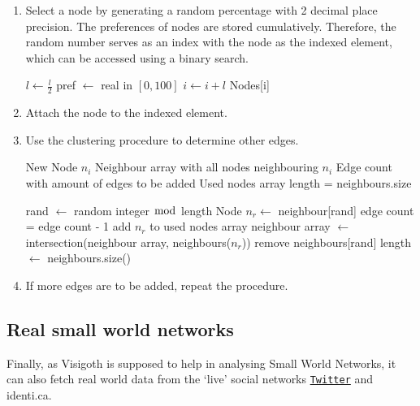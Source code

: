 \documentclass[a4paper,11pt,titlepage]{article}
\let\stdhref\href
\renewcommand{\href}[2]{\stdhref{#1}{\texttt{#2}}}
\newcommand{\Twitter}{\href{http://twitter.com}{Twitter} }
\begin{document}
\begin{enumerate}
  \item
    Select a node by generating a random percentage with 2 decimal place
    precision. The preferences of nodes are stored cumulatively. Therefore, the
    random number serves as an index with the node as the indexed element, which
    can be accessed using a binary search.

    \begin{algorithmic}
          \STATE $l \gets \frac{l}{2}$
            \STATE pref $\gets$ real in  $[0, 100]$
              \STATE $i \gets i+l$
            \ENDIF
          \ENDIF
        \ENDWHILE
      \ENDFOR
      \RETURN Nodes[i]
    \end{algorithmic}

  \item
    Attach the node to the indexed element.

   \item
    Use the clustering procedure to determine other edges.

    \begin{algorithmic}
      \REQUIRE New Node $n_i$
      \REQUIRE Neighbour array with all nodes neighbouring $n_i$
      \REQUIRE Edge count with amount of edges to be added
      \REQUIRE Used nodes array
      \STATE length = neighbours.size

        \STATE rand $\gets$ random integer $\bmod$ length
        \STATE Node $n_r \gets$ neighbour[rand]
          \STATE edge count = edge count - 1
        \STATE add $n_r$ to used nodes array
          \STATE neighbour array $\gets$ intersection(neighbour array, neighbours($n_r$))
        \ELSE
          \STATE remove neighbours[rand]
        \ENDIF
        \STATE length $\gets$ neighbours.size()
      \ENDWHILE
    \end{algorithmic}

   \item If more edges are to be added, repeat the procedure.
\end{enumerate}


\subsection{Real small world networks}
Finally, as Visigoth is supposed to help in analysing Small World
Networks, it can also fetch real world data from the `live' social
networks \Twitter and identi.ca.
\end{document}
